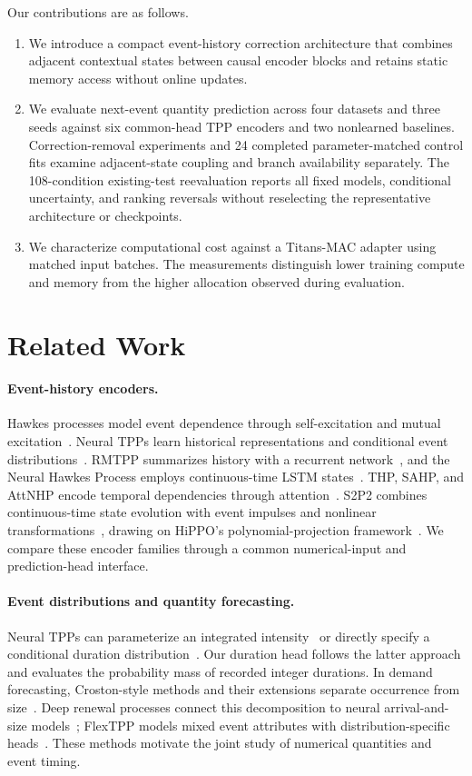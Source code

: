 \documentclass[runningheads]{llncs}
\begin{document}
Our contributions are as follows.
\begin{enumerate}
\item We introduce a compact event-history correction architecture that
combines adjacent contextual states between causal encoder blocks and retains
static memory access without online updates.
\item We evaluate next-event quantity prediction across four datasets and
three seeds against six common-head TPP encoders and two nonlearned baselines.
Correction-removal experiments and 24 completed parameter-matched control
fits examine adjacent-state coupling and branch availability separately.
The 108-condition existing-test reevaluation reports all fixed models,
conditional uncertainty, and ranking reversals without reselecting the
representative architecture or checkpoints.
\item We characterize computational cost against a Titans-MAC adapter using
matched input batches. The measurements distinguish lower training compute
and memory from the higher allocation observed during evaluation.
\end{enumerate}

\section{Related Work}
\paragraph{Event-history encoders.}
Hawkes processes model event dependence through self-excitation and mutual
excitation~\cite{hawkes1971spectra}. Neural TPPs learn historical
representations and conditional event distributions~\cite{shchur2021review}.
RMTPP summarizes history with a recurrent network~\cite{du2016rmtpp}, and the
Neural Hawkes Process employs continuous-time LSTM states~\cite{mei2017nhp}.
THP, SAHP, and AttNHP encode temporal dependencies through
attention~\cite{zuo2020thp,zhang2020sahp,yang2022attnhp}.
S2P2 combines continuous-time state evolution with event impulses and
nonlinear transformations~\cite{chang2025s2p2}, drawing on HiPPO's
polynomial-projection framework~\cite{gu2020hippo}. We compare these encoder
families through a common numerical-input and prediction-head interface.

\paragraph{Event distributions and quantity forecasting.}
Neural TPPs can parameterize an integrated intensity~\cite{omi2019fully} or
directly specify a conditional duration distribution~\cite{shchur2020intensityfree}.
Our duration head follows the latter approach and evaluates the probability
mass of recorded integer durations. In demand forecasting, Croston-style
methods and their extensions separate occurrence from
size~\cite{croston1972forecasting,syntetos2005accuracy,teunter2011obsolescence}.
Deep renewal processes connect this decomposition to neural arrival-and-size
models~\cite{turkmen2021renewal}; FlexTPP models mixed event attributes with
distribution-specific heads~\cite{draxler2025flextpp}. These methods motivate
the joint study of numerical quantities and event timing.
\end{document}
